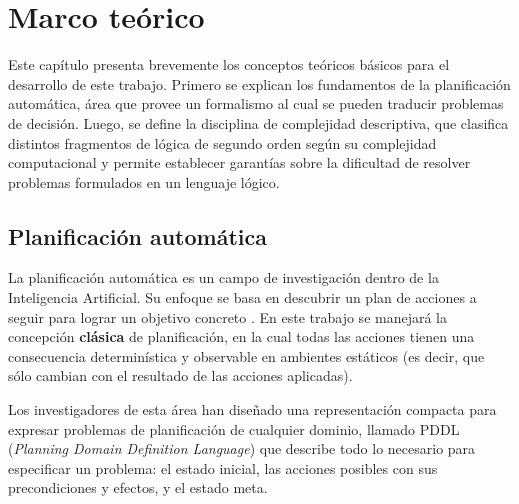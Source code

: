 
\chapter{Marco teórico}
\label{Chapter1}

Este capítulo presenta brevemente los conceptos teóricos básicos para el
desarrollo de este trabajo. Primero se explican los fundamentos de la
planificación automática, área que provee un formalismo al cual se pueden
traducir problemas de decisión. Luego, se define la disciplina de complejidad
descriptiva, que clasifica distintos fragmentos de lógica de segundo orden
según su complejidad computacional y permite establecer garantías sobre la
dificultad de resolver problemas formulados en un lenguaje lógico.


\section{Planificación automática}
La planificación automática es un campo de investigación dentro de la Inteligencia
Artificial. Su enfoque se basa en descubrir un plan de acciones a seguir para
lograr un objetivo concreto \citep{russell:book}. En este trabajo se manejará
la concepción \textbf{clásica} de planificación, en la cual todas las acciones
tienen una consecuencia determinística y observable en ambientes estáticos (es
decir, que sólo cambian con el resultado de las acciones aplicadas).

Los investigadores de esta área han diseñado una representación compacta para
expresar problemas de planificación de cualquier dominio, llamado PDDL 
(\textit{Planning Domain Definition Language}) que describe todo lo necesario
para especificar un problema: el estado inicial, las acciones posibles con sus
precondiciones y efectos, y el estado meta.

